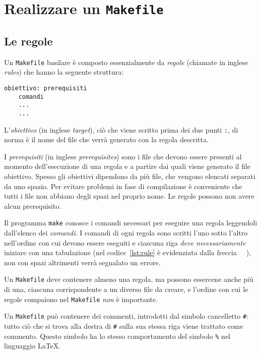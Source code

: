 \section{Realizzare un \texttt{Makefile}}
\label{sec:realizzare-makefile}

\subsection{Le regole}
\label{sec:le-regole}

Un \texttt{Makefile} basilare è composto essenzialmente da \emph{regole}
(chiamate in inglese \emph{rules}) che hanno la seguente struttura:
\begin{lstlisting}[showtabs=true,tab=\rightarrowfill,caption={Struttura di una
regola.},label=lst:rule]
obiettivo: prerequisiti
	comandi
	...
	...
\end{lstlisting}
L'\emph{obiettivo} (in inglese \emph{target}), ciò che viene scritto prima dei
due punti \texttt{:}, di norma è il nome del file che verrà generato con la
regola descritta.

I \emph{prerequisiti} (in inglese \emph{prerequisites}) sono i file che devono
essere presenti al momento dell'esecuzione di una regola e a partire dai quali
viene generato il file obiettivo.  Spesso gli obiettivi dipendono da più file,
che vengono elencati separati da uno spazio.  Per evitare problemi in fase di
compilazione è conveniente che tutti i file non abbiano degli spazi nel proprio
nome.  Le regole possono non avere alcun prerequisito.

Il programma \texttt{make} conosce i comandi necessari per eseguire una regola
leggendoli dall'elenco dei \emph{comandi}.  I comandi di ogni regola sono
scritti l'uno sotto l'altro nell'ordine con cui devono essere eseguiti e
ciascuna riga \emph{deve necessariamente} iniziare con una tabulazione (nel
codice~\ref{lst:rule} è evidenziata dalla freccia
\lstinline[showtabs=true,tab=\rightarrowfill]{	}), non con spazi altrimenti
verrà segnalato un errore.

Un \texttt{Makefile} deve contenere almeno una regola, ma possono essercene
anche più di una, ciascuna corrispondente a un diverso file da creare, e
l'ordine con cui le regole compaiono nel \texttt{Makefile} \emph{non} è
importante.

Un \texttt{Makefile} può contenere dei commenti, introdotti dal simbolo
cancelletto \texttt{\#}: tutto ciò che si trova alla destra di \texttt{\#} sulla
sua stessa riga viene trattato come commento.  Questo simbolo ha lo stesso
comportamento del simbolo \texttt{\%} nel linguaggio \LaTeX{}.

